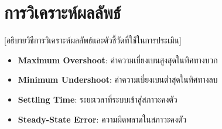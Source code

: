 \section{การวิเคราะห์ผลลัพธ์}

\noindent\hspace{\parindent}%
[อธิบายวิธีการวิเคราะห์ผลลัพธ์และตัวชี้วัดที่ใช้ในการประเมิน]

\begin{itemize}
  \item \textbf{Maximum Overshoot}: ค่าความเบี่ยงเบนสูงสุดในทิศทางบวก
  \item \textbf{Minimum Undershoot}: ค่าความเบี่ยงเบนต่ำสุดในทิศทางลบ
  \item \textbf{Settling Time}: ระยะเวลาที่ระบบเข้าสู่สภาวะคงตัว
  \item \textbf{Steady-State Error}: ความผิดพลาดในสภาวะคงตัว
\end{itemize}
